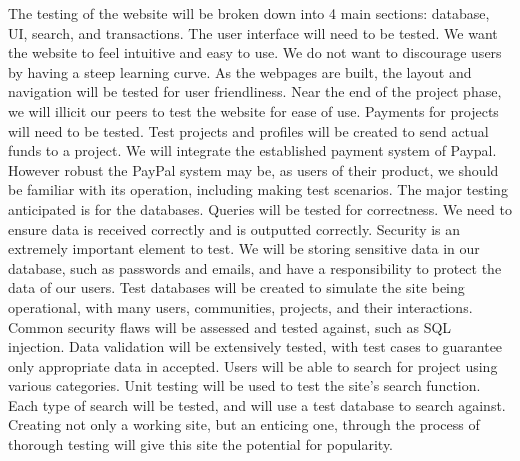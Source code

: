 \documentclass[12pt]{article}
\begin{document}
\begin{enumerate}
The testing of the website will be broken down into 4 main sections: database, UI, search, and transactions. The user interface will need to be tested. We want the website to feel intuitive and easy to use. We do not want to discourage users by having a steep learning curve. As the webpages are built, the layout and navigation will be tested for user friendliness. Near the end of the project phase, we will illicit our peers to test the website for ease of use. Payments for projects will need to be tested. Test projects and profiles will be created to send actual funds to a project. We will integrate the established payment system of Paypal. However robust the PayPal system may be, as users of their product, we should be familiar with its operation, including making test scenarios. The major testing anticipated is for the databases. Queries will be tested for correctness. We need to ensure data is received correctly and is outputted correctly. Security is an extremely important element to test. We will be storing sensitive data in our database, such as passwords and emails, and have a responsibility to protect the data of our users. Test databases will be created to simulate the site being operational, with many users, communities, projects, and their interactions. Common security flaws will be assessed and tested against, such as SQL injection. Data validation will be extensively tested, with test cases to guarantee only appropriate data in accepted. Users will be able to search for project using various categories. Unit testing will be used to test the site’s search function. Each type of search will be tested, and will use a test database to search against. Creating not only a working site, but an enticing one, through the process of thorough testing will give this site the potential for popularity.

\end{enumerate}
\end{document}
